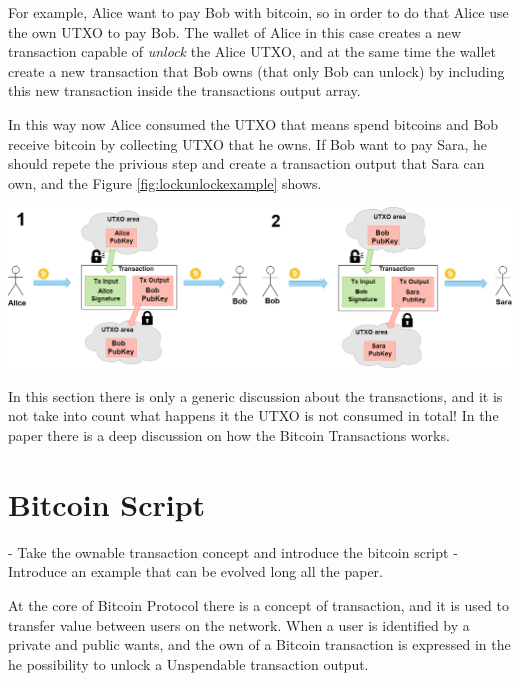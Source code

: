 \begin{example}
    \label{ex:how_spend_bitcoin}
    For example, Alice want to pay Bob with bitcoin, so in order to do that Alice
    use the own UTXO to pay Bob. The wallet of Alice in this case creates a new transaction
    capable of \emph{unlock} the Alice UTXO, and at the same time the wallet create 
    a new transaction that Bob owns (that only Bob can unlock) by including this new transaction inside the transactions output array. 

    In this way now Alice consumed the UTXO that means spend bitcoins and Bob receive bitcoin by collecting UTXO that he owns. 
    If Bob want to pay Sara, he should repete the privious step and create a transaction output that Sara can own,
    and the Figure \ref{fig:lockunlockexample} shows.

    {\centering
     \vspace{5pt}
      \includegraphics[scale=0.3]{imgs/DiagramUnlocLockUTXO.png}
      \vspace{10pt}
     \par}
\end{example}

In this section there is only a generic discussion about the transactions, and it is not take into count 
what happens it the UTXO is not consumed in total! In the paper \cite{Palazzo_Estrazione_di_Informazioni_2021}
there is a deep discussion on how the Bitcoin Transactions works.

\section{Bitcoin Script}

- Take the ownable transaction concept and introduce the bitcoin script
- Introduce an example that can be evolved long all the paper.

At the core of Bitcoin Protocol there is a concept of transaction, and it is used to transfer value
between users on the network. When a user is identified by a private and public wants, and the own of a
Bitcoin transaction is expressed in the he possibility to unlock a Unspendable transaction output.

